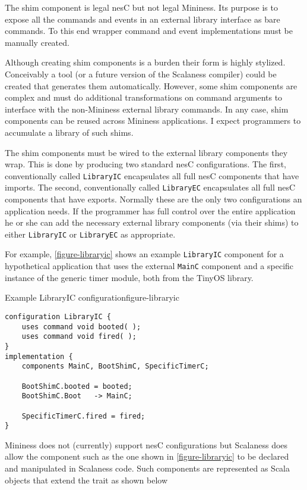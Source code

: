 The shim component is legal nesC but not legal Mininess. Its purpose is to expose all the
commands and events in an external library interface as bare commands. To this end wrapper
command and event implementations must be manually created.

Although creating shim components is a burden their form is highly stylized. Conceivably a tool
(or a future version of the Scalaness compiler) could be created that generates them
automatically. However, some shim components are complex and must do additional transformations
on command arguments to interface with the non-Mininess external library commands. In any case,
shim components can be reused across Mininess applications. I expect programmers to accumulate a
library of such shims.

The shim components must be wired to the external library components they wrap. This is done by
producing two standard nesC configurations. The first, conventionally called \texttt{LibraryIC}
encapsulates all full nesC components that have imports. The second, conventionally called
\texttt{LibraryEC} encapsulates all full nesC components that have exports. Normally these are
the only two configurations an application needs. If the programmer has full control over the
entire application he or she can add the necessary external library components (via their shims)
to either \texttt{LibraryIC} or \texttt{LibraryEC} as appropriate.

For example, \autoref{figure-libraryic} shows an example \texttt{LibraryIC} component for a
hypothetical application that uses the external \texttt{MainC} component and a specific instance
of the generic timer module, both from the TinyOS library.

\singlespace
\begin{fpfig}[tbhp]{Example LibraryIC configuration}{figure-libraryic}
{
\begin{lstlisting}[language=nesC]
configuration LibraryIC {
    uses command void booted( );
    uses command void fired( );
}
implementation {
    components MainC, BootShimC, SpecificTimerC;

    BootShimC.booted = booted;
    BootShimC.Boot   -> MainC;

    SpecificTimerC.fired = fired;
}
\end{lstlisting}
}
\end{fpfig}
\primaryspacing

Mininess does not (currently) support nesC configurations but Scalaness does allow the component
such as the one shown in \autoref{figure-libraryic} to be declared and manipulated in Scalaness
code. Such components are represented as Scala objects that extend the
 trait as shown below

